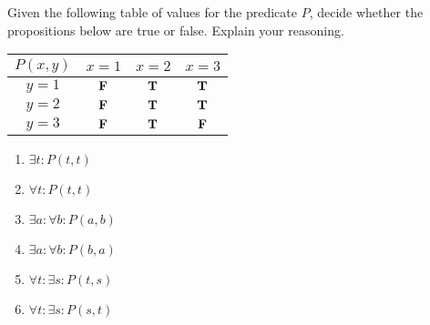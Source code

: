 	\begin{xca}
	
	Given the following table of values for the predicate $P$, decide whether the propositions below are true or false.  Explain your reasoning.
	
	\begin{table}[h!]
		\begin{center}
			\label{tab:table1}
			\begin{tabular}{c|c|c|c|}
				$P(x,y)$ &$x=1$ & $x=2$ & $x=3$  \\
				\hline
				$y=1$    &   $\textbf{\textrm{F}}$        &     $\textbf{\textrm{T}}$       &     $\textbf{\textrm{T}}$      \\
				\hline
				$y=2$   &    $\textbf{\textrm{F}}$       &     $\textbf{\textrm{T}}$        &    $\textbf{\textrm{T}}$      \\
				\hline
				$y=3$   &    $\textbf{\textrm{F}}$       &      $\textbf{\textrm{T}}$        &   $\textbf{\textrm{F}}$       \\
				\hline
			\end{tabular}
		\end{center}
	\end{table}
	
	\begin{enumerate}
		\item $\exists t: P(t,t)$
		\item $\forall t: P(t,t)$
		\item $\exists a: \forall b: P(a,b)$
		\item $\exists a: \forall b: P(b,a)$
		\item $\forall t: \exists s: P(t,s)$
		\item $\forall t: \exists s: P(s,t)$
	\end{enumerate}
	
	
\end{xca}

